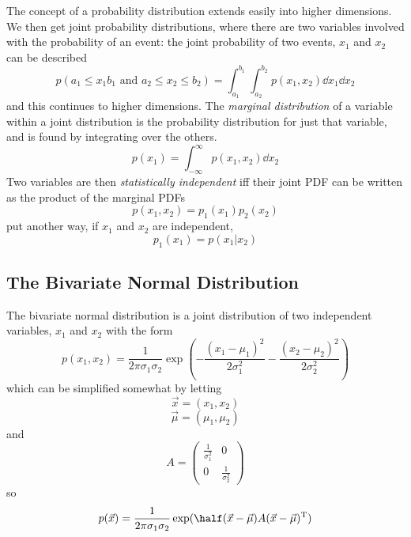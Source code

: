 \documentclass{dwnotes}         		        %
\begin{document}
The concept of a probability distribution extends easily into higher
dimensions. We then get joint probability distributions, where there
are two variables involved with the probability of an event: the joint
probability of two events, $x_1$ and $x_2$ can be described
\begin{equation*}
  p(a_1 \le x_1 b_1 \text{ and } a_2 \le x_2 \le b_2) = \int_{a_1}^{b_1} \int_{a_2}^{b_2} p(x_1, x_2) \dd{x_1} \dd{x_2}
\end{equation*}
and this continues to higher dimensions.  The {\em marginal
  distribution} of a variable within a joint distribution is the
probability distribution for just that variable, and is found by
integrating over the others.
\begin{equation}
  \label{eq:marginal}
  p(x_1) = \int_{-\infty}^{\infty} p(x_1, x_2) \dd{x_2}
\end{equation}
Two variables are then {\em statistically independent} iff their joint
PDF can be written as the product of the marginal PDFs
\begin{equation}
  \label{eq:independentvariables}
  p(x_1, x_2) = p_1(x_1) p_2(x_2)
\end{equation}
put another way, if $x_1$ and $x_2$ are independent, 
\[ p_1(x_1) = p(x_1|x_2) \]

\subsection{The Bivariate Normal Distribution}
\label{sec:bivar-norm-distr}

The bivariate normal distribution is a joint distribution of two
independent variables, $x_1$ and $x_2$ with the form
\begin{equation}
  \label{eq:bivariatenormal}
  p(x_1, x_2) = \frac{1}{2 \pi \sigma_1 \sigma_2} \exp( - \frac{(x_1 - \mu_1)^2}{2 \sigma_1^2} - \frac{(x_2 - \mu_2)^2}{2 \sigma_2^2} )
\end{equation}
which can be simplified somewhat by letting
\[ \vec{x} = (x_1, x_2) \] \[ \vec{\mu} = (\mu_1, \mu_2) \] and 
\[ A = \begin{pmatrix}  \frac{1}{\sigma_1^2} & 0\\ 0 & \frac{1}{\sigma_2^2} \end{pmatrix}\]
so
\begin{equation}
  \label{eq:binormal2}
  p(\vec{x}) = \frac{1}{2 \pi \sigma_1 \sigma_2} \exp( \half (\vec{x} - \vec{\mu}) A (\vec{x} - \vec{\mu})^{\rm T})
\end{equation}
\end{document}
